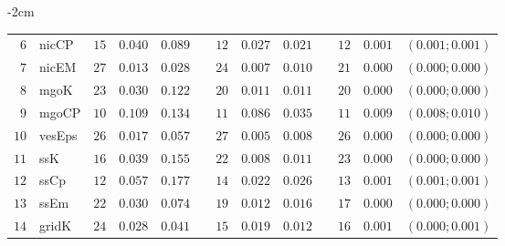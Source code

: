 \begin{table*}[!htbp]
\begin{adjustwidth*}{}{-2cm}
\begin{tabular}{@{}rlrrrrrrrrrcc@{}}
\footnotesize{$6 $} & \footnotesize{nicCP    } & \footnotesize{$15$} & \footnotesize{$0.040$} & \footnotesize{$0.089$} && \footnotesize{$12$} & \footnotesize{$0.027$} & \footnotesize{$0.021$} && \footnotesize{$12$} & \footnotesize{$0.001$} & \footnotesize{$(0.001;0.001)$} \\
\footnotesize{$7 $} & \footnotesize{nicEM    } & \footnotesize{$27$} & \footnotesize{$0.013$} & \footnotesize{$0.028$} && \footnotesize{$24$} & \footnotesize{$0.007$} & \footnotesize{$0.010$} && \footnotesize{$21$} & \footnotesize{$0.000$} & \footnotesize{$(0.000;0.000)$} \\
\footnotesize{$8 $} & \footnotesize{mgoK     } & \footnotesize{$23$} & \footnotesize{$0.030$} & \footnotesize{$0.122$} && \footnotesize{$20$} & \footnotesize{$0.011$} & \footnotesize{$0.011$} && \footnotesize{$20$} & \footnotesize{$0.000$} & \footnotesize{$(0.000;0.000)$} \\
\footnotesize{$9 $} & \footnotesize{mgoCP    } & \footnotesize{$10$} & \footnotesize{$0.109$} & \footnotesize{$0.134$} && \footnotesize{$11$} & \footnotesize{$0.086$} & \footnotesize{$0.035$} && \footnotesize{$11$} & \footnotesize{$0.009$} & \footnotesize{$(0.008;0.010)$} \\
\footnotesize{$10$} & \footnotesize{vesEps   } & \footnotesize{$26$} & \footnotesize{$0.017$} & \footnotesize{$0.057$} && \footnotesize{$27$} & \footnotesize{$0.005$} & \footnotesize{$0.008$} && \footnotesize{$26$} & \footnotesize{$0.000$} & \footnotesize{$(0.000;0.000)$} \\
\footnotesize{$11$} & \footnotesize{ssK      } & \footnotesize{$16$} & \footnotesize{$0.039$} & \footnotesize{$0.155$} && \footnotesize{$22$} & \footnotesize{$0.008$} & \footnotesize{$0.011$} && \footnotesize{$23$} & \footnotesize{$0.000$} & \footnotesize{$(0.000;0.000)$} \\
\footnotesize{$12$} & \footnotesize{ssCp     } & \footnotesize{$12$} & \footnotesize{$0.057$} & \footnotesize{$0.177$} && \footnotesize{$14$} & \footnotesize{$0.022$} & \footnotesize{$0.026$} && \footnotesize{$13$} & \footnotesize{$0.001$} & \footnotesize{$(0.001;0.001)$} \\
\footnotesize{$13$} & \footnotesize{ssEm     } & \footnotesize{$22$} & \footnotesize{$0.030$} & \footnotesize{$0.074$} && \footnotesize{$19$} & \footnotesize{$0.012$} & \footnotesize{$0.016$} && \footnotesize{$17$} & \footnotesize{$0.000$} & \footnotesize{$(0.000;0.000)$} \\
\footnotesize{$14$} & \footnotesize{gridK    } & \footnotesize{$24$} & \footnotesize{$0.028$} & \footnotesize{$0.041$} && \footnotesize{$15$} & \footnotesize{$0.019$} & \footnotesize{$0.012$} && \footnotesize{$16$} & \footnotesize{$0.001$} & \footnotesize{$(0.000;0.001)$} \\

\end{tabular}
\end{adjustwidth*}
\end{table*}

